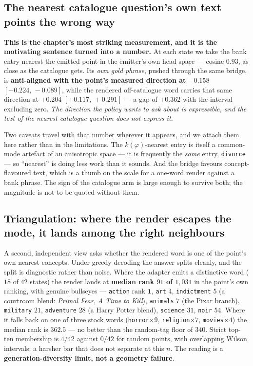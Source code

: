 \documentclass[11pt]{article}
\begin{document}
\subsection{The nearest catalogue question's own text points the wrong way}

\textbf{This is the chapter's most striking measurement, and it is the motivating sentence turned
into a number.} At each state we take the bank entry nearest the emitted point in the emitter's own
head space --- cosine $0.93$, as close as the catalogue gets. Its \emph{own gold phrase}, pushed
through the same bridge, is \textbf{anti-aligned with the point's measured direction at
$\mathbf{-0.158}$ $[-0.224,\,-0.089]$}, while the rendered off-catalogue word carries that same
direction at $\mathbf{+0.204}$ $[+0.117,\,+0.291]$ --- a gap of $+0.362$ with the interval excluding
zero. \emph{The direction the policy wants to ask about is expressible, and the text of the nearest
catalogue question does not express it.}

Two caveats travel with that number wherever it appears, and we attach them here rather than in the
limitations. The $k(\varphi)$-nearest entry is itself a common-mode artefact of an anisotropic space
--- it is frequently the \emph{same} entry, \texttt{divorce} --- so ``nearest'' is doing less work
than it sounds. And the bridge favours concept-flavoured text, which is a thumb on the scale for a
one-word render against a bank phrase. The sign of the catalogue arm is large enough to survive both;
the magnitude is not to be quoted without them.

\subsection{Triangulation: where the render escapes the mode, it lands among the right neighbours}

A second, independent view asks whether the rendered word is one of the point's own nearest concepts.
Under greedy decoding the answer splits cleanly, and the split is diagnostic rather than noise. Where
the adapter emits a distinctive word ($18$ of $42$ states) the render lands at \textbf{median rank
$91$ of $1{,}031$} in the point's own ranking, with genuine bullseyes --- \texttt{action} rank
$\mathbf{1}$, \texttt{art} $4$, \texttt{indictment} $5$ (a courtroom blend: \emph{Primal Fear},
\emph{A Time to Kill}), \texttt{animals} $7$ (the Pixar branch), \texttt{military} $21$,
\texttt{adventure} $28$ (a Harry Potter blend), \texttt{science} $31$, \texttt{noir} $54$. Where it
falls back on one of three stock words (\texttt{horror}$\times9$, \texttt{religion}$\times7$,
\texttt{movies}$\times4$) the median rank is $362.5$ --- no better than the random-tag floor of
$340$. Strict top-ten membership is $4/42$ against $0/42$ for random points, with overlapping Wilson
intervals: a harsher bar that does not separate at this $n$. The reading is a
\textbf{generation-diversity limit, not a geometry failure}.
\end{document}
